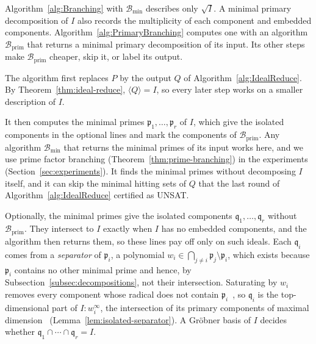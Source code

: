 Algorithm~\ref{alg:Branching} with $\mathcal B_{\min}$ describes only
$\sqrt I$. A minimal primary decomposition of $I$ also records the
multiplicity of each component and embedded components.
Algorithm~\ref{alg:PrimaryBranching} computes one with an algorithm
$\mathcal B_{\mathrm{prim}}$ that returns a minimal primary decomposition of
its input. Its other steps make $\mathcal B_{\mathrm{prim}}$ cheaper, skip it,
or label its output.

The algorithm first replaces $P$ by the output $Q$ of
Algorithm~\ref{alg:IdealReduce}. By Theorem~\ref{thm:ideal-reduce},
$\langle Q\rangle=I$, so every later step works on a smaller description of $I$.

It then computes the minimal primes $\mathfrak p_1,\ldots,\mathfrak p_r$ of
$I$, which give the isolated components in the optional lines and mark the
components of $\mathcal B_{\mathrm{prim}}$. Any algorithm $\mathcal B_{\min}$
that returns the minimal primes of its input works here, and we use prime
factor branching (Theorem~\ref{thm:prime-branching}) in the experiments
(Section~\ref{sec:experiments}). It finds the minimal primes without
decomposing $I$ itself, and it can skip the minimal hitting sets of $Q$ that
the last round of Algorithm~\ref{alg:IdealReduce} certified as UNSAT.

Optionally, the minimal primes give the isolated components
$\mathfrak q_1,\ldots,\mathfrak q_r$ without $\mathcal B_{\mathrm{prim}}$.
They intersect to $I$ exactly when $I$ has no embedded components, and the
algorithm then returns them, so these lines pay off only on such ideals. Each
$\mathfrak q_i$ comes from a \emph{separator} of $\mathfrak p_i$, a
polynomial $w_i\in\bigcap_{j\neq i}\mathfrak p_j\setminus\mathfrak p_i$,
which exists because $\mathfrak p_i$ contains no other minimal prime and hence,
by Subsection~\ref{subsec:decompositions}, not their intersection. Saturating
by $w_i$ removes every component whose radical does not contain
$\mathfrak p_i$~\cite{shimoyama1996localization}, so $\mathfrak q_i$ is the
top-dimensional part of $I:w_i^\infty$, the intersection of its primary
components of maximal dimension~\cite{eisenbud1992direct}
(Lemma~\ref{lem:isolated-separator}). A Gr\"obner basis of $I$ decides whether
$\mathfrak q_1\cap\cdots\cap\mathfrak q_r=I$.

